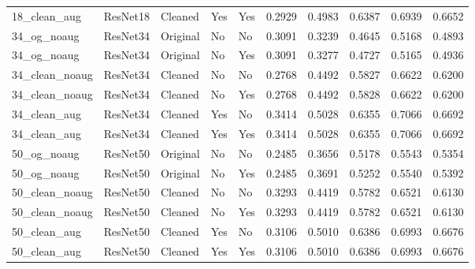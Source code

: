 \documentclass{article}
\begin{document}
\begin{table}[htbp]
\begin{adjustbox}{width=\textwidth}
\begin{tabular}{llllllllll}
    18\_clean\_aug   & ResNet18 & Cleaned  & Yes & Yes & 0.2929 & 0.4983 & 0.6387 & 0.6939 & 0.6652 \\
    34\_og\_noaug    & ResNet34 & Original & No  & No  & 0.3091 & 0.3239 & 0.4645 & 0.5168 & 0.4893 \\
    34\_og\_noaug    & ResNet34 & Original & No  & Yes & 0.3091 & 0.3277 & 0.4727 & 0.5165 & 0.4936 \\
    34\_clean\_noaug & ResNet34 & Cleaned  & No  & No  & 0.2768 & 0.4492 & 0.5827 & 0.6622 & 0.6200 \\
    34\_clean\_noaug & ResNet34 & Cleaned  & No  & Yes & 0.2768 & 0.4492 & 0.5828 & 0.6622 & 0.6200 \\
    34\_clean\_aug   & ResNet34 & Cleaned  & Yes & No  & 0.3414 & 0.5028 & 0.6355 & 0.7066 & 0.6692 \\
    34\_clean\_aug   & ResNet34 & Cleaned  & Yes & Yes & 0.3414 & 0.5028 & 0.6355 & 0.7066 & 0.6692 \\
    50\_og\_noaug    & ResNet50 & Original & No  & No  & 0.2485 & 0.3656 & 0.5178 & 0.5543 & 0.5354 \\
    50\_og\_noaug    & ResNet50 & Original & No  & Yes & 0.2485 & 0.3691 & 0.5252 & 0.5540 & 0.5392 \\
    50\_clean\_noaug & ResNet50 & Cleaned  & No  & No  & 0.3293 & 0.4419 & 0.5782 & 0.6521 & 0.6130 \\
    50\_clean\_noaug & ResNet50 & Cleaned  & No  & Yes & 0.3293 & 0.4419 & 0.5782 & 0.6521 & 0.6130 \\
    50\_clean\_aug   & ResNet50 & Cleaned  & Yes & No  & 0.3106 & 0.5010 & 0.6386 & 0.6993 & 0.6676 \\
    50\_clean\_aug   & ResNet50 & Cleaned  & Yes & Yes & 0.3106 & 0.5010 & 0.6386 & 0.6993 & 0.6676 \\
    \bottomrule
  \end{tabular}
  \end{adjustbox}
\end{table}
\end{document}
